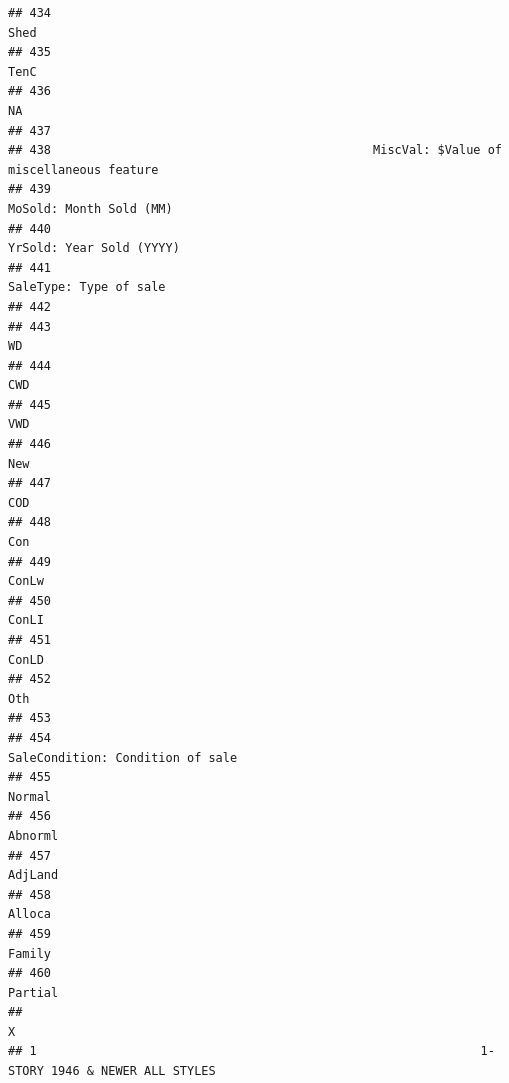 \documentclass[
]{article}
\begin{document}
\begin{verbatim}
## 434                                                                                 Shed
## 435                                                                                 TenC
## 436                                                                                   NA
## 437                                                                                     
## 438                                             MiscVal: $Value of miscellaneous feature
## 439                                                              MoSold: Month Sold (MM)
## 440                                                             YrSold: Year Sold (YYYY)
## 441                                                               SaleType: Type of sale
## 442                                                                                     
## 443                                                                                  WD 
## 444                                                                                  CWD
## 445                                                                                  VWD
## 446                                                                                  New
## 447                                                                                  COD
## 448                                                                                  Con
## 449                                                                                ConLw
## 450                                                                                ConLI
## 451                                                                                ConLD
## 452                                                                                  Oth
## 453                                                                                     
## 454                                                     SaleCondition: Condition of sale
## 455                                                                               Normal
## 456                                                                              Abnorml
## 457                                                                              AdjLand
## 458                                                                               Alloca
## 459                                                                               Family
## 460                                                                              Partial
##                                                                                              X
## 1                                                              1-STORY 1946 & NEWER ALL STYLES

\end{verbatim}
\end{document}
